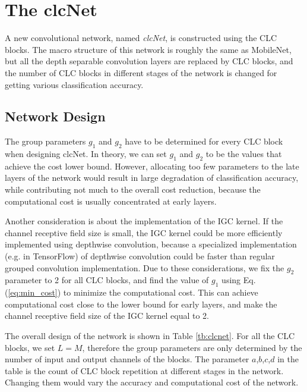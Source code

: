 \documentclass[10pt,twocolumn,letterpaper]{article}
\begin{document}
\section{The clcNet}
A new convolutional network, named  \textit{clcNet}, is constructed using the CLC blocks. The macro structure of this network is roughly the same as MobileNet, but all the depth separable convolution layers are replaced by CLC blocks, and the number of CLC blocks in different stages of the network is changed for getting various classification accuracy. 

\subsection{Network Design}

The group parameters $g_1$ and $g_2$ have to be determined for every CLC block when designing clcNet. In theory, we can set $g_1$ and $g_2$  to be the values that achieve the cost lower bound. However, allocating too few parameters to the late layers of the network would result in large degradation of classification accuracy, while contributing not much to the overall cost reduction, because the computational cost is usually concentrated at early layers. 

Another consideration is about the implementation of the IGC kernel. If the channel receptive field size is small, the IGC kernel could be more efficiently implemented using depthwise convolution, because a specialized implementation (e.g. in TensorFlow) of depthwise convolution could be faster than regular grouped convolution implementation. Due to these considerations, we fix the $g_2$ parameter to 2 for all CLC blocks, and find the value of $g_1$ using Eq.(\ref{eq:min_cost}) to minimize the computational cost. This can achieve computational cost close to the lower bound for early layers, and make the channel receptive field size of the IGC kernel equal to 2.

The overall design of the network is shown in Table \ref{tb:clcnet}. For all the CLC blocks, we set $L=M$, therefore the group parameters are only determined by the number of input and output channels of the blocks. The parameter $a$,$b$,$c$,$d$ in the table is the count of CLC block repetition at different stages in the network. Changing them would vary the accuracy and computational cost of the network.
\end{document}
